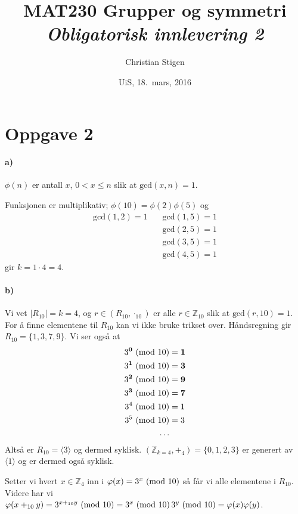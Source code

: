 \documentclass[a4paper,norsk,twocolumn,10pt]{article}
\title{MAT230 Grupper og symmetri\\ \textit{Obligatorisk innlevering 2}}
\author{Christian Stigen}
\date{UiS, 18.~mars, 2016}
\begin{document}
\maketitle

\section*{Oppgave 2}
\paragraph{\textbf{a)}}
$\phi{(n)}$ er antall $x$, $0 < x \leqslant n$ slik at $\text{gcd}{(x,n)} = 1$.

Funksjonen er multiplikativ; $\phi{(10)} = \phi{(2)} \phi{(5)}$ og
\begin{align*}
  \text{gcd}(1, 2) = 1 \quad & \text{gcd}(1, 5) = 1 \\
                       & \text{gcd}(2, 5) = 1 \\
                       & \text{gcd}(3, 5) = 1 \\
                       & \text{gcd}(4, 5) = 1
\end{align*}
gir $k = 1\cdot4 =4 $.

\paragraph{\textbf{b)}}
Vi vet $|R_{10}| = k = 4$, og $r \in (R_{10}, \cdot_{10})$ er alle $r \in
\mathbb{Z}_{10}$ slik at $\text{gcd}(r, 10) = 1$. For å finne elementene til
$R_{10}$ kan vi ikke bruke trikset over. Håndsregning gir $R_{10} = \{ 1,3,7,9
\}$. Vi ser også at
\begin{align*}
  3^\textbf{0} \ (\text{mod}\ 10) &= \textbf{1} \\
  3^\textbf{1} \ (\text{mod}\ 10) &= \textbf{3} \\
  3^\textbf{2} \ (\text{mod}\ 10) &= \textbf{9} \\
  3^\textbf{3} \ (\text{mod}\ 10) &= \textbf{7} \\
  3^4 \ (\text{mod}\ 10) &= 1 \\
  3^5 \ (\text{mod}\ 10) &= 3 \\
  \ldots
\end{align*}
Altså er $R_{10} = \langle 3 \rangle$ og dermed syklisk.  $\left(
\mathbb{Z}_{k=4}, +_4 \right) = \{0,1,2,3\}$ er generert av $\langle 1 \rangle$
og er dermed også syklisk.

Setter vi hvert $x \in \mathbb{Z}_4$ inn i $\varphi{(x)} = 3^x \ (\text{mod}\ 10)$ så får
vi alle elementene i $R_{10}$.  Videre har vi $\varphi{(x +_{10} y)} =
3^{x +_{10} y}\ (\text{mod}\ 10) = 3^x\ (\text{mod}\ 10)\, 3^y\ (\text{mod}\ 10) = \varphi{(x)}\varphi{(y)}$.
\end{document}
